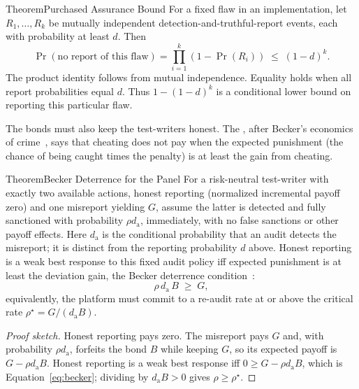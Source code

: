 \documentclass[11pt,a4paper]{article}
\theoremstyle{definition}
\theoremstyle{definition}
\theoremstyle{remark}
\begin{document}
\begin{pdclaim}{Theorem}{Purchased Assurance Bound}
\setlength{\parskip}{4pt plus 1pt}
\label{thm:assurance}
For a fixed flaw in an implementation, let $R_1,\ldots,R_k$ be mutually
independent detection-and-truthful-report events, each with probability at least
$d$. Then
\begin{equation}
\Pr(\text{no report of this flaw})
 =\prod_{i=1}^k(1-\Pr(R_i))\;\le\;(1-d)^k.
\end{equation}
The product identity follows from mutual independence. Equality holds when
all report probabilities equal $d$. Thus $1-(1-d)^k$ is a conditional lower
bound on reporting this particular flaw.
\end{pdclaim}


The bonds must also keep the test-writers honest. The
, after Becker's economics of crime~,
says that cheating does not pay when the expected punishment (the chance of
being caught times the penalty) is at least the gain from cheating.
\begin{pdclaim}{Theorem}{Becker Deterrence for the Panel}
\setlength{\parskip}{4pt plus 1pt}
\label{prop:becker-deterrence}
For a risk-neutral test-writer with exactly two available actions, honest
reporting (normalized incremental payoff zero) and one misreport yielding
$G$, assume the latter is detected and fully sanctioned with probability
$\rho d_{\mathrm a}$, immediately, with no false sanctions or other payoff effects. Here
$d_{\mathrm a}$ is the conditional probability that an audit detects the
misreport; it is distinct from the reporting probability $d$ above.
Honest reporting is a weak best response to this fixed audit policy iff
expected punishment is at least the deviation gain, the Becker deterrence condition~:
\begin{equation}\label{eq:becker}
\rho\, d_{\mathrm a}\, B \;\ge\; G ,
\end{equation}
equivalently, the platform must commit to a re-audit rate at or above the
critical rate $\rho^\star = G/(d_{\mathrm a}B)$.
\end{pdclaim}
\begin{proof}[Proof sketch]
Honest reporting pays zero. The misreport pays $G$ and, with probability
$\rho d_{\mathrm a}$, forfeits the bond $B$ while keeping $G$, so its expected
payoff is $G-\rho d_{\mathrm a}B$. Honest reporting is a weak best response
iff $0\ge G-\rho d_{\mathrm a}B$, which is Equation~\ref{eq:becker};
dividing by $d_{\mathrm a}B>0$ gives $\rho\ge\rho^\star$.
\end{proof}
\end{document}
